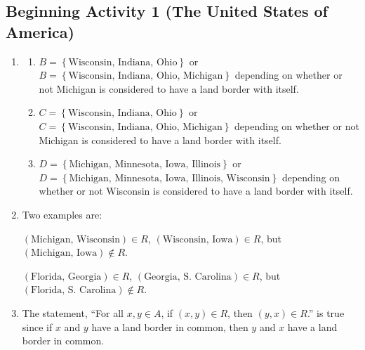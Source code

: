 \documentclass[11pt]{article}
\begin{document}
\subsection*{Beginning Activity 1 (The United States of America)}
\begin{enumerate}
\item \begin{enumerate}
\item $B = \left\{ {\text{Wisconsin, Indiana, Ohio}} \right\}$ or 
$B = \left\{ {\text{Wisconsin, Indiana, Ohio, Michigan}} \right\}$ depending on whether or not Michigan is considered to have a land border with itself.	

\item $C = \left\{ {\text{Wisconsin, Indiana, Ohio}} \right\}$ or 
$C = \left\{ {\text{Wisconsin, Indiana, Ohio, Michigan}} \right\}$ depending on whether or not Michigan is considered to have a land border with itself.

\item $D = \left\{ {\text{Michigan, Minnesota, Iowa, Illinois}} \right\}$ or 
$D = \left\{ {\text{Michigan, Minnesota, Iowa, Illinois, Wisconsin}} \right\}$ depending on whether or not Wisconsin is considered to have a land border with itself.	
\end{enumerate}

\item Two examples are:

$\left( {\text{Michigan, Wisconsin}} \right) \in R$, 
$\left( {\text{Wisconsin, Iowa}} \right) \in R$, but  
$\left( {\text{Michigan, Iowa}} \right) \notin R$.

$\left( {\text{Florida, Georgia}} \right) \in R$, 
$\left( {\text{Georgia, S}\text{. Carolina}} \right) \in R$, but  
$\left( {\text{Florida, S}\text{. Carolina}} \right) \notin R$.

\item The statement, ``For all $x, y \in A$, if $(x, y) \in R$, then $(y, x) \in R$.'' is true since if $x$ and $y$ have a land border in common, then $y$ and $x$ have a land border in common.
\end{enumerate}
\hbreak
\end{document}
